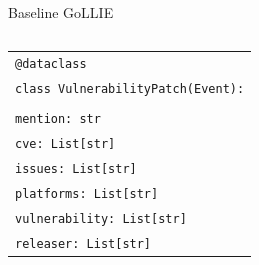 \documentclass[
    11pt,
    notheorems,
    xcolor={dvipsnames},
    hyperref={
        pdfstartview=FitH, 
        pdftitle={Ikasketa-adibide urriko Informazio-Erauzketa}, 
        pdfauthor={Oscar Sainz Jimenez}, 
        citecolor=secondary, 
    }
]{beamer}
\begin{document}
\begin{frame}
    \begin{block}{Baseline \hspace{14.5em}GoLLIE}
        \begin{columns}[t]
            \begin{column}{0.36\textwidth}
                \begin{table}
                    \vspace{-3.5em}
                    \begin{tabular}{p{\textwidth}}
                        \texttt{\small\textcolor{github-purple}{@dataclass}}                                                                              \\
                        \texttt{\small\textcolor{github-red}{class} \textcolor{github-dark-red}{VulnerabilityPatch}(\textcolor{github-dark-red}{Event}):} \\ \\
                        \texttt{\small\quad mention: str}                                                                                                 \\
                        \texttt{\small\quad cve: \textcolor{github-dark-red}{List}[str]}                                                                  \\
                        \texttt{\small\quad issues: \textcolor{github-dark-red}{List}[str]}                                                               \\
                        \texttt{\small\quad platforms: \textcolor{github-dark-red}{List}[str]}                                                            \\
                        \texttt{\small\quad vulnerability: \textcolor{github-dark-red}{List}[str]}                                                        \\
                        \texttt{\small\quad releaser: \textcolor{github-dark-red}{List}[str]}                                                             \\
                    \end{tabular}
                \end{table}
            \end{column}
            \vrule{}
            \begin{column}{0.58\textwidth}

\end{column}
\end{columns}
\end{block}
\end{frame}
\end{document}
